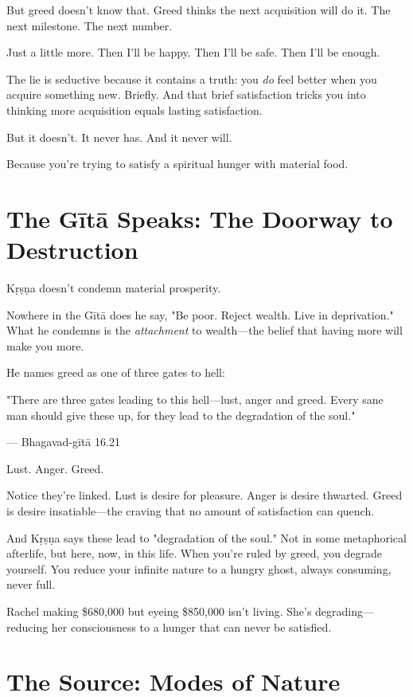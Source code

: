 \documentclass[11pt,twoside]{book}
\begin{document}
But greed doesn't know that. Greed thinks the next acquisition will do it. The next milestone. The next number.

Just a little more. Then I'll be happy. Then I'll be safe. Then I'll be enough.

The lie is seductive because it contains a truth: you \emph{do} feel better when you acquire something new. Briefly. And that brief satisfaction tricks you into thinking more acquisition equals lasting satisfaction.

But it doesn't. It never has. And it never will.

Because you're trying to satisfy a spiritual hunger with material food.

\section*{The Gītā Speaks: The Doorway to Destruction}

Kṛṣṇa doesn't condemn material prosperity.

Nowhere in the Gītā does he say, "Be poor. Reject wealth. Live in deprivation." What he condemns is the \emph{attachment} to wealth—the belief that having more will make you more.

He names greed as one of three gates to hell:

\begin{pullquote}
"There are three gates leading to this hell—lust, anger and greed. Every sane man should give these up, for they lead to the degradation of the soul."

--- Bhagavad-gītā 16.21
\end{pullquote}

Lust. Anger. Greed.

Notice they're linked. Lust is desire for pleasure. Anger is desire thwarted. Greed is desire insatiable—the craving that no amount of satisfaction can quench.

And Kṛṣṇa says these lead to "degradation of the soul." Not in some metaphorical afterlife, but here, now, in this life. When you're ruled by greed, you degrade yourself. You reduce your infinite nature to a hungry ghost, always consuming, never full.

Rachel making \$680,000 but eyeing \$850,000 isn't living. She's degrading—reducing her consciousness to a hunger that can never be satisfied.

\section*{The Source: Modes of Nature}
\end{document}
